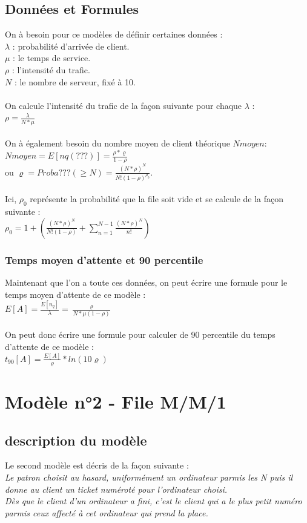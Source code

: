 \documentclass[a4paper,11pt]{article}
\begin{document}
	\subsection{Données et Formules}
	On à besoin pour ce modèles de définir certaines données :\\
	$\lambda$ : probabilité d'arrivée de client.\\
	$\mu$ : le temps de service.\\
	$\rho$ : l'intensité du trafic.\\
	$N$ : le nombre de serveur, fixé à 10.\\
	\\
	On calcule l'intensité du trafic de la façon suivante pour chaque 	$\lambda$ : \\
	$\rho = \frac{\lambda}{N*\mu}$\\
	\\
	On à également besoin du nombre moyen de client théorique $Nmoyen$:\\
	$Nmoyen = E[nq(???)] = \frac{\rho * \varrho}{1-\rho}$\\
	ou $\varrho = Proba???(\ge N) = \frac{(N*\rho)^{N}}{N!(1-\rho)^{\rho_{0}}}$.\\
	\\
	Ici, $\rho_{0}$ représente la probabilité que la file soit vide et se calcule de la façon suivante :\\
	$\rho_{0} = 1 + (\frac{(N*\rho)^{N}}{N!(1-\rho)}+\sum^{N-1}_{n = 1}\frac{(N*\rho)^{N}}{n!})$\\
		\subsubsection{Temps moyen d'attente et 90 percentile}
		Maintenant que l'on a toute ces données, on peut écrire une formule pour le temps moyen d'attente de ce modèle :\\
		$E[A] = \frac{E[n_{q}]}{\lambda} = \frac{\varrho}{N*\mu(1-\rho)}$\\
		\\
		On peut donc écrire une formule pour calculer de 90 percentile du temps d'attente de ce modèle :\\
		$t_{90}[A] = \frac{E[A]}{\varrho}*ln(10\varrho)$\\
	

\section{Modèle n°2 - File M/M/1}
	\subsection{description du modèle}
	Le second modèle est décris de la façon suivante :\\
	\textit{Le patron choisit au hasard, uniformément un ordinateur parmis les N puis il donne au client un ticket numéroté pour l'ordinateur choisi.\\
			Dès que le client d'un ordinateur a fini, c'est le client qui a le plus petit numéro parmis ceux affecté à cet ordinateur qui prend la place.}
\end{document}

